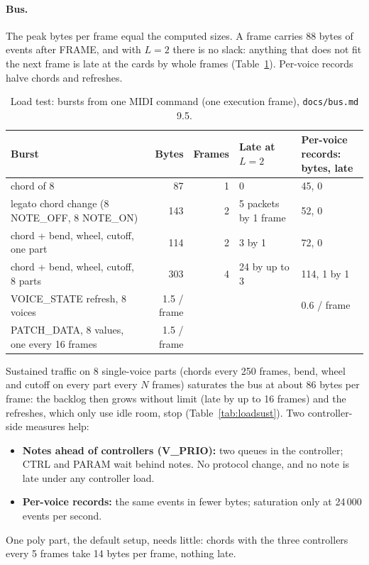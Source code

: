 \documentclass[11pt,a4paper]{article}
\newcommand{\file}[1]{\texttt{#1}}
\begin{document}
\paragraph{Bus.} The peak bytes per frame equal the computed sizes. A frame carries 88 bytes of events after FRAME,
and with $L = 2$ there is no slack: anything that does not fit the next frame is late at the cards by whole frames
(Table~\ref{tab:loadburst}). Per-voice records halve chords and refreshes.

\begin{table}[htbp]
\centering\small
\caption{Load test: bursts from one MIDI command (one execution frame), \file{docs/bus.md} 9.5.}\label{tab:loadburst}
\begin{tabularx}{\textwidth}{@{}X r r l l@{}}
\toprule
Burst & Bytes & Frames & Late at $L = 2$ & \shortstack[l]{Per-voice records:\\bytes, late} \\
\midrule
chord of 8 & 87 & 1 & 0 & 45, 0 \\
legato chord change (8 NOTE\_OFF, 8 NOTE\_ON) & 143 & 2 & 5 packets by 1 frame & 52, 0 \\
chord + bend, wheel, cutoff, one part & 114 & 2 & 3 by 1 & 72, 0 \\
chord + bend, wheel, cutoff, 8 parts & 303 & 4 & 24 by up to 3 & 114, 1 by 1 \\
VOICE\_STATE refresh, 8 voices & 1.5 / frame & & & 0.6 / frame \\
PATCH\_DATA, 8 values, one every 16 frames & 1.5 / frame & & & \\
\bottomrule
\end{tabularx}
\end{table}

Sustained traffic on 8 single-voice parts (chords every 250 frames, bend, wheel and cutoff on every part every $N$
frames) saturates the bus at about 86 bytes per frame: the backlog then grows without limit (late by up to 16 frames)
and the refreshes, which only use idle room, stop (Table~\ref{tab:loadsust}). Two controller-side measures help:
\begin{itemize}
  \item \textbf{Notes ahead of controllers (V\_PRIO):} two queues in the controller; CTRL and PARAM wait behind notes.
    No protocol change, and no note is late under any controller load.
  \item \textbf{Per-voice records:} the same events in fewer bytes; saturation only at 24\,000 events per second.
\end{itemize}
One poly part, the default setup, needs little: chords with the three controllers every 5 frames take 14 bytes per
frame, nothing late.
\end{document}
